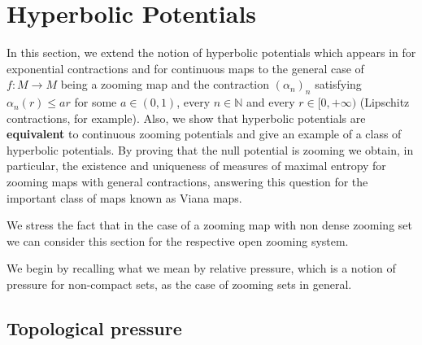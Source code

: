\documentclass[12pt,a4paper]{amsart}
\theoremstyle{plain}
\begin{document}
\section{Hyperbolic Potentials}\label{Hyperbolic}

In this section, we extend the notion of hyperbolic potentials which appears in \cite{AOS} for exponential contractions and for continuous maps to the general case of $f:M \to M$ being a zooming map and  the contraction $(\alpha_{n})_{n}$ satisfying $\alpha_{n}(r) \leq ar$ for some $a \in (0,1)$, every $n \in \mathbb{N}$ and every $r \in [0,+\infty)$ (Lipschitz contractions, for example). Also, we show that hyperbolic potentials are \textbf{equivalent} to continuous zooming potentials and give an example of a class of hyperbolic potentials. By proving that the null potential is zooming we obtain, in particular, the existence and uniqueness of measures of maximal entropy for zooming maps with general contractions, answering this question for the important class of maps known as Viana maps.

We stress the fact that in the case of a zooming map with non dense zooming set we can consider this section for the respective open zooming system.

We begin by recalling what we mean by relative pressure, which is a notion of pressure for non-compact sets, as the case of zooming sets in general.

\subsection{Topological pressure}
\end{document}
